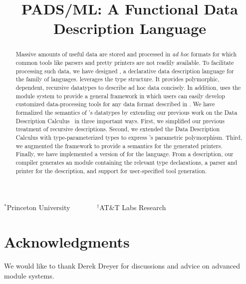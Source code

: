 \documentclass[nocopyrightspace]{sigplanconf}
\begin{document}
\title{PADS/ML: A Functional Data Description Language}
{$^\ast$Princeton University \ \ \ \ \ \ \ $^\dagger$AT\&T Labs Research}
 { \ \ \ \ }



\maketitle{}

\begin{abstract}  

  Massive amounts of useful data are stored and processed in
  \textit{ad hoc} formats for which common tools like parsers and
  pretty printers are not readily available.    To
  facilitate processing such data, we have designed \padsml{}, a
  declarative data description language for the \ml{} family of
  languages.  \padsml{} leverages the \ml{} type structure. It provides
  polymorphic, dependent, recursive datatypes to describe
  ad hoc data concisely.  In addition, \padsml{} uses the \ml{} module system to
  provide a general framework in which users can easily develop customized
  data-processing tools for any data format described in \padsml{}.
  We have formalized the semantics of \padsml{}'s datatypes by
  extending our previous work on the Data Description
  Calculus~\cite{fisher+:next700ddl} in three important ways.
  First, we simplified our previous treatment of recursive 
  descriptions.  Second, we extended the Data Description Calculus
  with type-parameterized types to express \padsml{}'s parametric polymorphism. 
  Third, we augmented the framework to provide a semantics
  for the generated printers.  Finally, we
  have implemented a version of \padsml{} for the \ocaml{} language.
  From a \padsml{} description, our compiler generates an \ocaml{}
  module containing the relevant type declarations, a parser and printer
  for the description, and support for user-specified tool generation.

\end{abstract}















\section*{Acknowledgments}

We would like to thank Derek Dreyer for discussions and advice on
advanced module systems.



%


\end{document}
